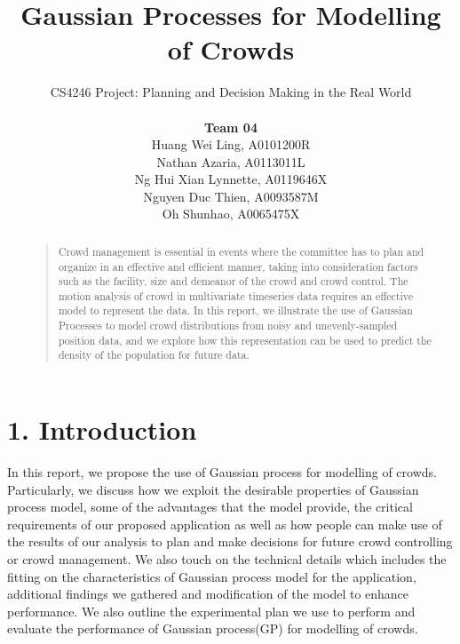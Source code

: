 \documentclass[letterpaper]{article}
\begin{document}
%
\title{Gaussian Processes for Modelling of Crowds}
\author{CS4246 Project: Planning and Decision Making in the Real World  \\ \\
{\bf Team 04} \\
Huang Wei Ling, A0101200R\\
Nathan Azaria, A0113011L\\
Ng Hui Xian Lynnette, A0119646X\\
Nguyen Duc Thien, A0093587M\\
Oh Shunhao, A0065475X\\
}
\maketitle
\begin{abstract}
\begin{quote}
Crowd management is essential in events where the committee has to plan and organize in an effective and efficient manner, taking into consideration factors such as the facility, size and demeanor of the crowd and crowd control. The motion analysis of crowd in multivariate timeseries data requires an effective model to represent the data. In this report, we illustrate the use of Gaussian Processes to model crowd distributions from noisy and unevenly-sampled position data, and we explore how this representation can be used to predict the density of the population for future data.
\end{quote}
\end{abstract}

\section{1.  Introduction}
In this report, we propose the use of Gaussian process for modelling of crowds. Particularly, we discuss how we exploit the desirable properties of Gaussian process model, some of the advantages that the model provide, the critical requirements of our proposed application as well as how people can make use of the results of our analysis to plan and make decisions for future crowd controlling or crowd management. We also touch on the technical details which includes the fitting on the characteristics of Gaussian process model for the application, additional findings we gathered and modification of the model to enhance performance. We also outline the experimental plan we use to perform and evaluate the performance of Gaussian process(GP) for modelling of crowds.
\end{document}
